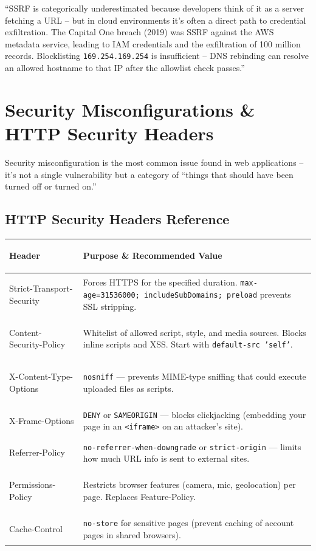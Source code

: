 \documentclass[11pt, letterpaper]{article}
\newcommand{\talkingpoint}[1]{%
  \begin{tcolorbox}[colback=talkbg, colframe=talkborder,
    title={\bfseries Interview Talking Point}, arc=3pt, boxrule=1pt]
  #1
  \end{tcolorbox}%
}
\begin{document}
\talkingpoint{``SSRF is categorically underestimated because developers think of it as a server fetching a URL -- but in cloud environments it's often a direct path to credential exfiltration. The Capital One breach (2019) was SSRF against the AWS metadata service, leading to IAM credentials and the exfiltration of 100 million records. Blocklisting \texttt{169.254.169.254} is insufficient -- DNS rebinding can resolve an allowed hostname to that IP after the allowlist check passes.''}

\section*{Security Misconfigurations \& HTTP Security Headers}

Security misconfiguration is the most common issue found in web applications -- it's not a single vulnerability but a category of ``things that should have been turned off or turned on.''

\subsection*{HTTP Security Headers Reference}

\noindent
{\small\renewcommand{\arraystretch}{1.6}
\begin{tabularx}{\textwidth}{>{\ttfamily\bfseries\raggedright\arraybackslash}p{4.5cm}
                              >{\raggedright\arraybackslash}X}
\toprule
\rowcolor{tableheaderred}
\textbf{Header} & \textbf{Purpose \& Recommended Value} \\
\midrule
\rowcolor{rowRe} Strict-Transport-Security & Forces HTTPS for the specified duration. \texttt{max-age=31536000; includeSubDomains; preload} prevents SSL stripping. \\
\rowcolor{rowA}  Content-Security-Policy   & Whitelist of allowed script, style, and media sources. Blocks inline scripts and XSS. Start with \texttt{default-src 'self'}. \\
\rowcolor{rowRe} X-Content-Type-Options    & \texttt{nosniff} --- prevents MIME-type sniffing that could execute uploaded files as scripts. \\
\rowcolor{rowA}  X-Frame-Options           & \texttt{DENY} or \texttt{SAMEORIGIN} --- blocks clickjacking (embedding your page in an \texttt{<iframe>} on an attacker's site). \\
\rowcolor{rowRe} Referrer-Policy           & \texttt{no-referrer-when-downgrade} or \texttt{strict-origin} --- limits how much URL info is sent to external sites. \\
\rowcolor{rowA}  Permissions-Policy        & Restricts browser features (camera, mic, geolocation) per page. Replaces Feature-Policy. \\
\rowcolor{rowRe} Cache-Control             & \texttt{no-store} for sensitive pages (prevent caching of account pages in shared browsers). \\
\bottomrule
\end{tabularx}}
\end{document}
